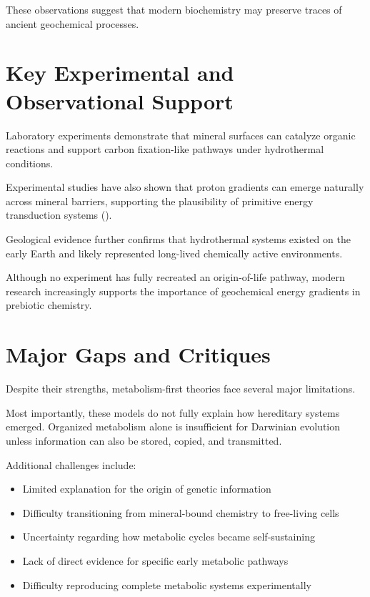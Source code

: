 \documentclass[
  oneside]{book}
\providecommand{\tightlist}{%
  \setlength{\itemsep}{0pt}\setlength{\parskip}{0pt}}
\begin{document}
These observations suggest that modern biochemistry may preserve traces of ancient geochemical processes.

\section{Key Experimental and Observational Support}\label{key-experimental-and-observational-support-2}

Laboratory experiments demonstrate that mineral surfaces can catalyze organic reactions and support carbon fixation-like pathways under hydrothermal conditions.

Experimental studies have also shown that proton gradients can emerge naturally across mineral barriers, supporting the plausibility of primitive energy transduction systems ().

Geological evidence further confirms that hydrothermal systems existed on the early Earth and likely represented long-lived chemically active environments.

Although no experiment has fully recreated an origin-of-life pathway, modern research increasingly supports the importance of geochemical energy gradients in prebiotic chemistry.

\section{Major Gaps and Critiques}\label{major-gaps-and-critiques-2}

Despite their strengths, metabolism-first theories face several major limitations.

Most importantly, these models do not fully explain how hereditary systems emerged. Organized metabolism alone is insufficient for Darwinian evolution unless information can also be stored, copied, and transmitted.

Additional challenges include:

\begin{itemize}
\tightlist
\item
  Limited explanation for the origin of genetic information
\item
  Difficulty transitioning from mineral-bound chemistry to free-living cells
\item
  Uncertainty regarding how metabolic cycles became self-sustaining
\item
  Lack of direct evidence for specific early metabolic pathways
\item
  Difficulty reproducing complete metabolic systems experimentally
\end{itemize}
\end{document}
